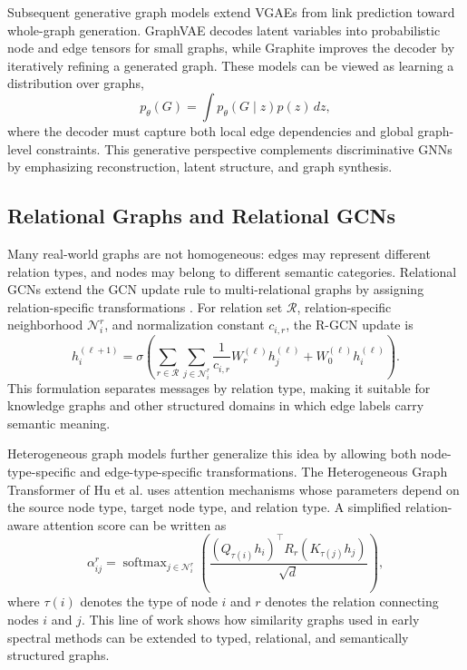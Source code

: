 \documentclass[11pt]{article}
\begin{document}
Subsequent generative graph models extend VGAEs from link prediction toward whole-graph generation. GraphVAE \cite{simonovsky2018graphvae} decodes latent variables into probabilistic node and edge tensors for small graphs, while Graphite \cite{grover2019graphite} improves the decoder by iteratively refining a generated graph. These models can be viewed as learning a distribution over graphs,
\[
    p_\theta(G)
    = \int p_\theta(G\mid z)p(z)\,dz,
\]
where the decoder must capture both local edge dependencies and global graph-level constraints. This generative perspective complements discriminative GNNs by emphasizing reconstruction, latent structure, and graph synthesis.

\subsection{Relational Graphs and Relational GCNs}
Many real-world graphs are not homogeneous: edges may represent different relation types, and nodes may belong to different semantic categories. Relational GCNs extend the GCN update rule to multi-relational graphs by assigning relation-specific transformations \cite{schlichtkrull2018modeling}. For relation set $\mathcal{R}$, relation-specific neighborhood $\mathcal{N}_i^r$, and normalization constant $c_{i,r}$, the R-GCN update is
\[
    h_i^{(\ell+1)}
    = \sigma\!\left(
        \sum_{r\in\mathcal{R}}\sum_{j\in\mathcal{N}_i^r}
        \frac{1}{c_{i,r}} W_r^{(\ell)}h_j^{(\ell)}
        + W_0^{(\ell)}h_i^{(\ell)}
      \right).
\]
This formulation separates messages by relation type, making it suitable for knowledge graphs and other structured domains in which edge labels carry semantic meaning.

Heterogeneous graph models further generalize this idea by allowing both node-type-specific and edge-type-specific transformations. The Heterogeneous Graph Transformer of Hu et al. \cite{hu2020heterogeneous} uses attention mechanisms whose parameters depend on the source node type, target node type, and relation type. A simplified relation-aware attention score can be written as
\[
    \alpha_{ij}^{r}
    = \operatorname{softmax}_{j\in\mathcal{N}_i^r}
      \left(
      \frac{(Q_{\tau(i)}h_i)^\top R_r(K_{\tau(j)}h_j)}{\sqrt{d}}
      \right),
\]
where $\tau(i)$ denotes the type of node $i$ and $r$ denotes the relation connecting nodes $i$ and $j$. This line of work shows how similarity graphs used in early spectral methods can be extended to typed, relational, and semantically structured graphs.
\end{document}
